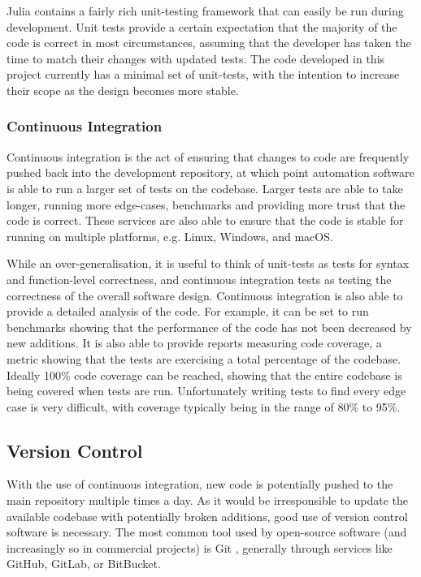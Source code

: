  Julia contains a fairly rich unit-testing framework that can easily be run during development. Unit tests provide a certain expectation that the majority of the code is correct in most circumstances, assuming that the developer has taken the time to match their changes with updated tests. The code developed in this project currently has a minimal set of unit-tests, with the intention to increase their scope as the design becomes more stable.

\subsubsection{Continuous Integration}
Continuous integration is the act of ensuring that changes to code are frequently pushed back into the development repository, at which point automation software is able to run a larger set of tests on the codebase. Larger tests are able to take longer, running more edge-cases, benchmarks and providing more trust that the code is correct. These services are also able to ensure that the code is stable for running on multiple platforms, e.g. Linux, Windows, and macOS.

While an over-generalisation, it is useful to think of unit-tests as tests for syntax and function-level correctness, and continuous integration tests as testing the correctness of the overall software design. Continuous integration is also able to provide a detailed analysis of the code. For example, it can be set to run benchmarks showing that the performance of the code has not been decreased by new additions. It is also able to provide reports measuring code coverage, a metric showing that the tests are exercising a total percentage of the codebase. Ideally 100\% code coverage can be reached, showing that the entire codebase is being covered when tests are run. Unfortunately writing tests to find every edge case is very difficult, with coverage typically being in the range of 80\% to 95\%. 

\subsection{Version Control}
With the use of continuous integration, new code is potentially pushed to the main repository multiple times a day. As it would be irresponsible to update the available codebase with potentially broken additions, good use of version control software is necessary. The most common tool used by open-source software (and increasingly so in commercial projects) is Git \cite{Git}, generally through services like GitHub, GitLab, or BitBucket. 

